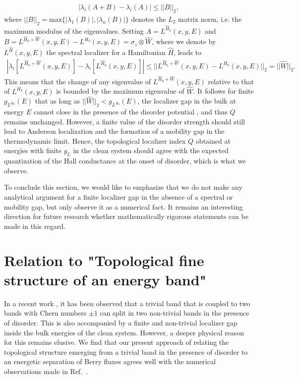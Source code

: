 \documentclass[aps,prb,amsmath,amssymb,twocolumn, superscriptaddress]{revtex4-2}
\newcommand{\BM}[1]{{\color{orange} #1}}
\begin{document}
\begin{align}
|\lambda_i(A + B) - \lambda_i(A)| \leq ||B||_2,
\end{align}
where $||B||_2 = \text{max}\{|\lambda_1(B)|, |\lambda_n(B)|\}$ denotes the $L_2$ matrix norm, i.e. the maximum modulus of the eigenvalues. Setting $A = L^{\hat H_0}(x,y,E)$ and $B = L^{\hat H_0 + \hat W}(x,y,E) - L^{H_0}(x,y,E) = \sigma_z \otimes \hat W$, where we denote by $L^{\hat H}(x,y,E)$ the spectral localizer for a Hamiltonian $\hat H$, leads to 
\begin{align}
\left |\lambda_i\left[L^{\hat H_0 + \hat W}(x,y,E)\right] - \lambda_i \left[L^{\hat H_0}(x,y,E)\right] \right| \leq ||L^{\hat H_0 + \hat W}(x,y,E) - L^{H_0}(x,y,E)||_2 = ||\hat W ||_2.
\end{align}
This means that the change of any eigenvalue of $L^{\hat H_0 + \hat W}(x,y,E)$ relative to that of $L^{H_0}(x,y,E)$ is bounded by the maximum eigenvalue of $\hat W$. It follows for finite $g_{L^{H_0}}(E)$ that as long as $||\hat W ||_2 < g_{L^{H_0}}(E)$, the localizer gap in the bulk at energy $E$ cannot close in the presence of the disorder potential\BM{, and thus $Q$ remains unchanged}. However, a finite value of the disorder strength should still lead to Anderson localization and the formation of a mobility gap in the thermodynamic limit. \BM{Hence}, the topological localizer index $Q$ \BM{obtained at energies with finite $g_L$ in the clean system should agree with the expected quantization of the Hall conductance at the onset of disorder}, which is what we observe. 

To conclude this section, we would like to emphasize that we do not make any analytical argument for a finite localizer gap in the absence of a spectral or mobility gap, but only observe it as a numerical fact. It remains an interesting direction for future research whether mathematically rigorous statements can be made in this regard. 

\section{Relation to "Topological fine structure of an energy band"} 
In a recent work \cite{Fine_structure_App}, it has been observed that a trivial band that is coupled to two bands with Chern numbers $\pm 1$ can split in two non-trivial bands in the presence of disorder. This is also accompanied by a finite and non-trivial localizer gap inside the bulk energies of the clean system. However, a deeper physical reason for this remains elusive. We find that our present approach of relating the topological structure emerging from a trivial band in the presence of disorder to an energetic separation of Berry fluxes agrees well with the numerical observations made in Ref.~\cite{Fine_structure_App}.
\end{document}
